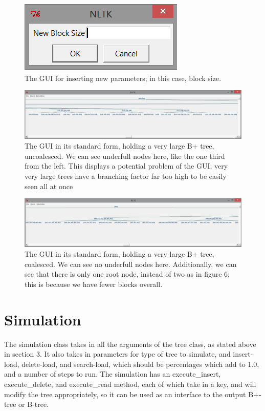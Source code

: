 \documentclass[fleqn]{article}
\begin{document}
\begin{figure}[h!]
\centerline{\includegraphics{Images/gui5.png}}
\caption{The GUI for inserting new parameters; in this case, block size.}
\end{figure}

\begin{figure}[h!]
\centerline{\includegraphics[width=1.2\linewidth]{Images/gui7.png}}
\caption{The GUI in its standard form, holding a very large B+ tree, uncoalesced.  We can see underfull nodes here, like the one third from the left.  This displays a potential problem of the GUI; very very large trees have a branching factor far too high to be easily seen all at once}
\end{figure}

\begin{figure}[h!]
\centerline{\includegraphics[width=1.2\linewidth]{Images/gui8.png}}
\caption{The GUI in its standard form, holding a very large B+ tree, coalesced.  We can see no underfull nodes here.  Additionally, we can see that there is only one root node, instead of two as in figure 6; this is because we have fewer blocks overall.}
\end{figure}

\clearpage

\section{Simulation}
The simulation class takes in all the arguments of the tree class, as stated above in section 3.  It also takes in parameters for type of tree to simulate, and insert-load, delete-load, and search-load, which should be percentages which add to 1.0, and a number of steps to run.  The simulation has an execute\_insert, execute\_delete, and execute\_read method, each of which take in a key, and will modify the tree appropriately, so it can be used as an interface to the output B+-tree or B-tree.\\
\end{document}
